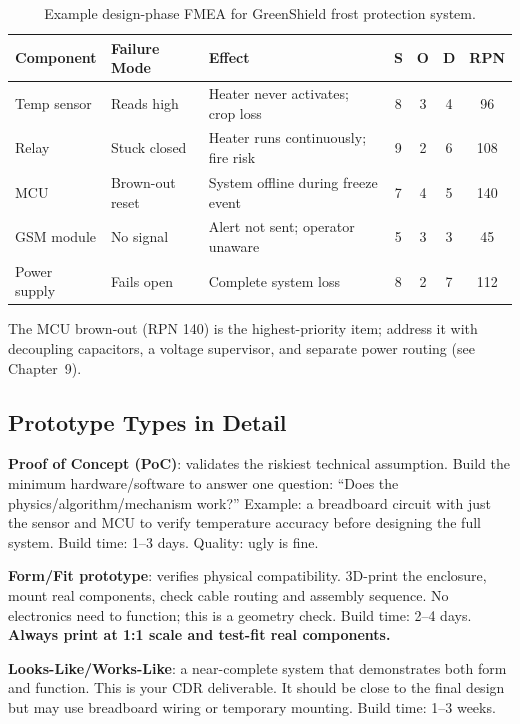 \documentclass[11pt,letterpaper,twoside,openany]{book}
\begin{document}
\begin{table}[htbp]\centering\small
\begin{tabularx}{\textwidth}{l l X c c c c}
\toprule
\textbf{Component} & \textbf{Failure Mode} & \textbf{Effect} & \textbf{S} & \textbf{O} & \textbf{D} & \textbf{RPN} \\
\midrule
Temp sensor & Reads high & Heater never activates; crop loss & 8 & 3 & 4 & 96 \\
Relay & Stuck closed & Heater runs continuously; fire risk & 9 & 2 & 6 & 108 \\
MCU & Brown-out reset & System offline during freeze event & 7 & 4 & 5 & 140 \\
GSM module & No signal & Alert not sent; operator unaware & 5 & 3 & 3 & 45 \\
Power supply & Fails open & Complete system loss & 8 & 2 & 7 & 112 \\
\bottomrule
\end{tabularx}
\caption{Example design-phase FMEA for GreenShield frost protection system.}
\end{table}

The MCU brown-out (RPN 140) is the highest-priority item; address it with decoupling capacitors, a voltage supervisor, and separate power routing (see Chapter~9).


\subsection{Prototype Types in Detail}
\textbf{Proof of Concept (PoC)}: validates the riskiest technical assumption. Build the minimum hardware/software to answer one question: ``Does the physics/algorithm/mechanism work?'' Example: a breadboard circuit with just the sensor and MCU to verify temperature accuracy before designing the full system. Build time: 1--3 days. Quality: ugly is fine.

\textbf{Form/Fit prototype}: verifies physical compatibility. 3D-print the enclosure, mount real components, check cable routing and assembly sequence. No electronics need to function; this is a geometry check. Build time: 2--4 days. \textbf{Always print at 1:1 scale and test-fit real components.}

\textbf{Looks-Like/Works-Like}: a near-complete system that demonstrates both form and function. This is your CDR deliverable. It should be close to the final design but may use breadboard wiring or temporary mounting. Build time: 1--3 weeks.
\end{document}
